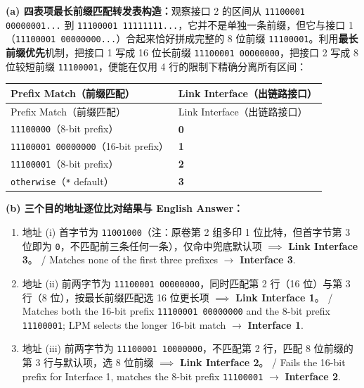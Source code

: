 \textbf{(a) 四表项最长前缀匹配转发表构造：}观察接口 2 的区间从 \texttt{11100001 00000001...} 到 \texttt{11100001 11111111...}，它并不是单独一条前缀，但它与接口 1（\texttt{11100001 00000000...}）合起来恰好拼成完整的 8 位前缀 \texttt{11100001}。利用\textbf{最长前缀优先}机制，把接口 1 写成 16 位长前缀 \texttt{11100001 00000000}，把接口 2 写成 8 位较短前缀 \texttt{11100001}，便能在仅用 4 行的限制下精确分离所有区间：

\begingroup\small\setlength{\tabcolsep}{3pt}\renewcommand{\arraystretch}{1.20}
\begin{longtable}{@{}>{\raggedright\arraybackslash}p{}>{\raggedright\arraybackslash}p{}@{}}
\toprule
Prefix Match（前缀匹配） & Link Interface（出链路接口） \\
\midrule\endfirsthead
Prefix Match（前缀匹配） & Link Interface（出链路接口） \\
\midrule\endhead
\bottomrule\endfoot
\texttt{11100000}（8-bit prefix） & \textbf{0} \\
\texttt{11100001 00000000}（16-bit prefix） & \textbf{1} \\
\texttt{11100001}（8-bit prefix） & \textbf{2} \\
\texttt{otherwise}（\texttt{*} default） & \textbf{3} \\
\end{longtable}\endgroup

\textbf{(b) 三个目的地址逐位比对结果与 English Answer：}
\begin{enumerate}
\item 地址 (i) 首字节为 \texttt{11001000}（注：原卷第 2 组多印 1 位比特，但首字节第 3 位即为 \texttt{0}，不匹配前三条任何一条），仅命中兜底默认项 $\implies$ \textbf{Link Interface 3}。 / Matches none of the first three prefixes $\to$ \textbf{Interface 3}.
\item 地址 (ii) 前两字节为 \texttt{11100001 00000000}，同时匹配第 2 行（16 位）与第 3 行（8 位），按最长前缀匹配选 16 位更长项 $\implies$ \textbf{Link Interface 1}。 / Matches both the 16-bit prefix \texttt{11100001 00000000} and the 8-bit prefix \texttt{11100001}; LPM selects the longer 16-bit match $\to$ \textbf{Interface 1}.
\item 地址 (iii) 前两字节为 \texttt{11100001 10000000}，不匹配第 2 行，匹配 8 位前缀的第 3 行与默认项，选 8 位前缀 $\implies$ \textbf{Link Interface 2}。 / Fails the 16-bit prefix for Interface 1, matches the 8-bit prefix \texttt{11100001} $\to$ \textbf{Interface 2}.
\end{enumerate}

